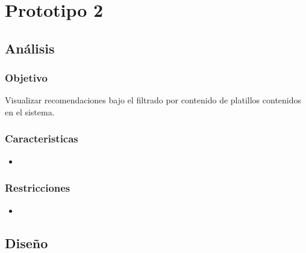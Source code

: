 \chapter{Prototipo 2}
  \section{Análisis}
    \subsection{Objetivo}
      Visualizar recomendaciones bajo el filtrado por contenido de platillos contenidos en el sistema.
    \subsection{Caracteristicas}
    \begin{itemize}
      \item 
    \end{itemize}

    \subsection{Restricciones}
    \begin{itemize}
      \item 
    \end{itemize}

  \section{Diseño}

